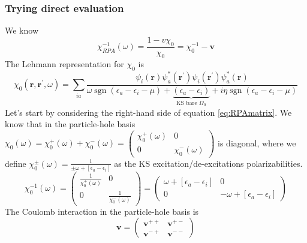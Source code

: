 \subsubsection{Trying direct evaluation}
We know
\begin{equation}
    \chi_{RPA}^{-1}(\omega) = \frac{1-v \chi_0}{\chi_0} = \chi_0^{-1} - \mathbf{v}
\label{eq:RPAmatrix}
\end{equation}
The Lehmann representation for $\chi_0$ is
\begin{equation}
    \chi_{0}\left(\mathbf{r}, \mathbf{r}^{\prime}, \omega\right)=\sum_{ia}\frac{\psi_{i}(\mathbf{r}) \psi_{a}^{*}(\mathbf{r}^{\prime}) \psi_{i}(\mathbf{r}^{\prime}) \psi_{a}^{*}(\mathbf{r})}{\omega\operatorname{sgn}\left(\epsilon_{a}-\epsilon_{i} - \mu\right)+\underbrace{\left(\epsilon_{a}-\epsilon_{i}\right)}_{\text{KS bare } \Omega _0}+i \eta \operatorname{sgn}\left(\epsilon_{a}-\epsilon_{i} - \mu\right)}
\label{eq:chi0Lehmann}
\end{equation}
Let's start by considering the right-hand side of equation \ref{eq:RPAmatrix}. We know that in the particle-hole basis $\chi_0(\omega )= \chi_0^{+}(\omega ) + \chi_0^{-}(\omega ) = \begin{pmatrix}
    \chi_0^{+}(\omega ) & 0 \\
    0 & \chi_0^{-}(\omega )
\end{pmatrix}$ is diagonal, where we define $\chi_0^{\pm}(\omega ) = \frac{1}{\pm\omega + \left[\epsilon_a - \epsilon_i\right]}$ as the KS excitation/de-excitations polarizabilities.
\begin{equation}
    \chi_0^{-1}(\omega ) = \begin{pmatrix}
        \frac{1}{\chi_0^{+}(\omega )} & 0 \\
        0 & \frac{1}{\chi_0^{-}(\omega )}
    \end{pmatrix}
= \begin{pmatrix}
    \omega + \left[\epsilon_a - \epsilon_i\right] & 0 \\
    0 & -\omega + \left[\epsilon_a - \epsilon_i\right]
\end{pmatrix}
\end{equation}
The Coulomb interaction in the particle-hole basis is
\begin{equation}
    \mathbf{v} = \begin{pmatrix}
        \mathbf{v}^{++} & \mathbf{v}^{+-} \\
        \mathbf{v}^{-+} & \mathbf{v}^{--}
    \end{pmatrix}
\end{equation}

